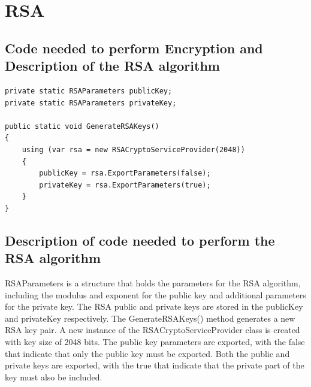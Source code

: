 \documentclass[a4paper,oneside,11pt]{book}
\begin{document}
\chapter[RSA]{RSA}

\section{Code needed to perform Encryption and Description of the RSA algorithm}

\begin{lstlisting}[language=Csh, caption={Code for RSA algorithm}]
private static RSAParameters publicKey;
private static RSAParameters privateKey;

public static void GenerateRSAKeys()
{
    using (var rsa = new RSACryptoServiceProvider(2048))
    {
        publicKey = rsa.ExportParameters(false);
        privateKey = rsa.ExportParameters(true);
    }
}
\end{lstlisting}

\section{Description of code needed to perform the RSA algorithm}

RSAParameters is a structure that holds the parameters for the RSA algorithm, including the modulus and exponent for the public key and additional parameters for the private key. The RSA public and private keys are stored in the publicKey and privateKey respectively. The GenerateRSAKeys() method generates a new RSA key pair. A new instance of the RSACryptoServiceProvider class is created with key size of 2048 bits. The public key parameters are exported, with the false that indicate that only the public key must be exported. Both the public and private keys are exported, with the true that indicate that the private part of the key must also be included.
\end{document}
